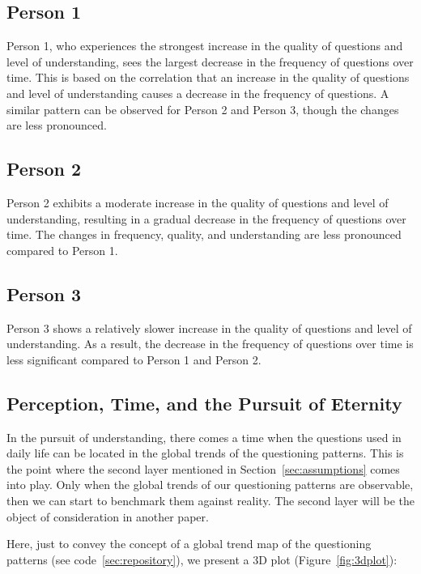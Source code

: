 \documentclass{article}
\begin{document}
    \subsection{Person 1}

    Person 1, who experiences the strongest increase in the quality of questions and level of understanding, sees the largest decrease in the frequency of questions over time. This is based on the correlation that an increase in the quality of questions and level of understanding causes a decrease in the frequency of questions. A similar pattern can be observed for Person 2 and Person 3, though the changes are less pronounced.

    \subsection{Person 2}

    Person 2 exhibits a moderate increase in the quality of questions and level of understanding, resulting in a gradual decrease in the frequency of questions over time. The changes in frequency, quality, and understanding are less pronounced compared to Person 1.

    \subsection{Person 3}

    Person 3 shows a relatively slower increase in the quality of questions and level of understanding. As a result, the decrease in the frequency of questions over time is less significant compared to Person 1 and Person 2.

    \subsection{Perception, Time, and the Pursuit of Eternity}

    In the pursuit of understanding, there comes a time when the questions used in daily life can be located in the global trends of the questioning patterns. This is the point where the second layer mentioned in Section~\ref{sec:assumptions} comes into play. Only when the global trends of our questioning patterns are observable, then we can start to benchmark them against reality. The second layer will be the object of consideration in another paper.

    Here, just to convey the concept of a global trend map of the questioning patterns (see code~\ref{sec:repository}), we present a 3D plot (Figure~\ref{fig:3dplot}):
\end{document}
